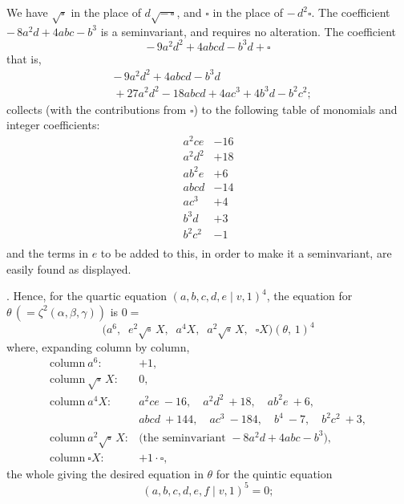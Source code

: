 \documentclass[11pt]{article}
\newcommand{\Cdel}{\mid}
\begin{document}
\noindent We have $\sqrt{\square}$ in the place of $d\sqrt{-\,\square}$, and $\square$ in the place of $-\,d^2\square$. The coefficient $-\,8a^2 d + 4abc - b^3$ is a seminvariant, and requires no alteration. The coefficient
\[
   -\,9a^2 d^2 + 4abcd - b^3 d + \square
\]
that is,
\[
\begin{aligned}
   & -\,9a^2 d^2 + 4abcd - b^3 d\\
   & {} + 27 a^2 d^2 - 18 abcd + 4 a c^3 + 4 b^3 d - b^2 c^2;
\end{aligned}
\]
collects (with the contributions from $\square$) to the following table of monomials and integer coefficients:
\[
\begin{array}{rr}
a^2 c e   & -16\\
a^2 d^2   & +18\\
a b^2 e   & +6\\
a b c d   & -14\\
a c^3     & +4\\
b^3 d     & +3\\
b^2 c^2   & -1\\
\end{array}
\]
and the terms in $e$ to be added to this, in order to make it a seminvariant, are easily found as displayed.

\medskip

. Hence, for the quartic equation $(a, b, c, d, e \Cdel v, 1)^4$, the equation for $\theta\,(=\zeta^2(\alpha, \beta, \gamma))$ is $0 =$
\[
\bigl(a^6,\;\; e^2\sqrt{\square}\,X,\;\; a^4 X,\;\; a^2\sqrt{\square}\,X,\;\; \square X\bigr)(\theta,\,1)^4
\]
where, expanding column by column,
\[
\begin{array}{ll}
\text{column}\ a^6:               & +1,\\
\text{column}\ \sqrt{\square}\,X: & 0,\\
\text{column}\ a^4 X:             & a^2 c e\ {-}16,\quad a^2 d^2\ {+}18,\quad a b^2 e\ {+}6,\\
                                 & a b c d\ {+}144,\quad a c^3\ {-}184,\quad b^4\ {-}7,\quad b^2 c^2\ {+}3,\\
\text{column}\ a^2\sqrt{\square}\,X: & \text{(the seminvariant }{-}8 a^2 d + 4 a b c - b^3),\\
\text{column}\ \square X:         & +1\cdot\square,
\end{array}
\]
the whole giving the desired equation in $\theta$ for the quintic equation
\[
   (a, b, c, d, e, f \Cdel v, 1)^5 = 0;
\]

\newpage
\setcounter{page}{281}
\end{document}
